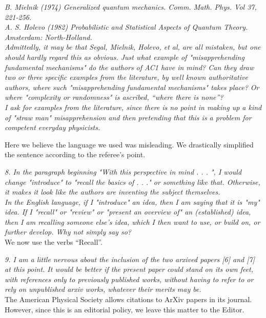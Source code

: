 \documentclass{article}
\newcommand{\REVIEW}[1]{{ \it \textcolor{reviewblack}{#1}}}
\newcommand{\REPLY}[1]{\textcolor{UCDBlue}{#1}}
\begin{document}
\REVIEW{B. Mielnik (1974) Generalized quantum mechanics. Comm. Math. Phys. Vol 37, 221-256.}\\

\REVIEW{A. S. Holevo (1982) Probabilistic and Statistical Aspects of Quantum Theory. Amsterdam: North-Holland.}\\

\REVIEW{Admittedly, it may be that Segal, Mielnik, Holevo, et al, are all mistaken, but one should hardly regard this as obvious. Just what example of "misapprehending fundamental mechanisms" do the authors of AC1 have in mind? Can they draw two or three specific examples from the literature, by well known authoritative authors, where such "misapprehending fundamental mechanisms" takes place? Or where "complexity or randomness" is ascribed, “where there is none”?}\\

\REVIEW{I ask for examples from the literature, since there is no point in making up a kind of "straw man" misapprehension and then pretending that this is a problem for competent everyday physicists.}

\REPLY{Here we believe the language we used was misleading. We drastically simplified the sentence according to the referee's point.}


\REVIEW{8. In the paragraph beginning "With this perspective in mind . . . ", I would change "introduce" to "recall the basics of . . ." or something like that. Otherwise, it makes it look like the authors are inventing the subject themselves.}\\

\REVIEW{In the English language, if I "introduce" an idea, then I am saying that it is "my" idea. If I "recall" or "review" or "present an overview of" an (established) idea, then I am recalling someone else's idea, which I then want to use, or build on, or further develop. Why not simply say so?}\\

\REPLY{We now use the verbs ``Recall''. }

\REVIEW{9. I am a little nervous about the inclusion of the two arxived papers [6] and [7] at this point. It would be better if the present paper could stand on its own feet, with references only to previously published works, without having to refer to or rely on unpublished arxiv works, whatever their merits may be.}\\

\REPLY{The American Physical Society allows citations to ArXiv papers in its journal. However, since this is an editorial policy, we leave this matter to the Editor.}
\end{document}
